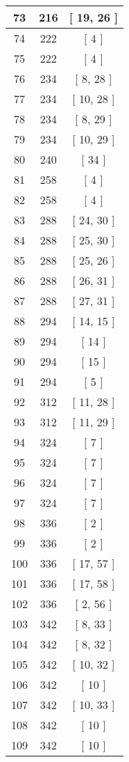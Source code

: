 \begin{center}
\begin{longtable}[H]{|| c c c ||}
\hline
73 & 216 & [ 19, 26 ] \\ 
\hline
74 & 222 & [ 4 ] \\ 
\hline
75 & 222 & [ 4 ] \\ 
\hline
76 & 234 & [ 8, 28 ] \\ 
\hline
77 & 234 & [ 10, 28 ] \\ 
\hline
78 & 234 & [ 8, 29 ] \\ 
\hline
79 & 234 & [ 10, 29 ] \\ 
\hline
80 & 240 & [ 34 ] \\ 
\hline
81 & 258 & [ 4 ] \\ 
\hline
82 & 258 & [ 4 ] \\ 
\hline
83 & 288 & [ 24, 30 ] \\ 
\hline
84 & 288 & [ 25, 30 ] \\ 
\hline
85 & 288 & [ 25, 26 ] \\ 
\hline
86 & 288 & [ 26, 31 ] \\ 
\hline
87 & 288 & [ 27, 31 ] \\ 
\hline
88 & 294 & [ 14, 15 ] \\ 
\hline
89 & 294 & [ 14 ] \\ 
\hline
90 & 294 & [ 15 ] \\ 
\hline
91 & 294 & [ 5 ] \\ 
\hline
92 & 312 & [ 11, 28 ] \\ 
\hline
93 & 312 & [ 11, 29 ] \\ 
\hline
94 & 324 & [ 7 ] \\ 
\hline
95 & 324 & [ 7 ] \\ 
\hline
96 & 324 & [ 7 ] \\ 
\hline
97 & 324 & [ 7 ] \\ 
\hline
98 & 336 & [ 2 ] \\ 
\hline
99 & 336 & [ 2 ] \\ 
\hline
100 & 336 & [ 17, 57 ] \\ 
\hline
101 & 336 & [ 17, 58 ] \\ 
\hline
102 & 336 & [ 2, 56 ] \\ 
\hline
103 & 342 & [ 8, 33 ] \\ 
\hline
104 & 342 & [ 8, 32 ] \\ 
\hline
105 & 342 & [ 10, 32 ] \\ 
\hline
106 & 342 & [ 10 ] \\ 
\hline
107 & 342 & [ 10, 33 ] \\ 
\hline
108 & 342 & [ 10 ] \\ 
\hline
109 & 342 & [ 10 ] \\ 

\end{longtable}
\end{center}

